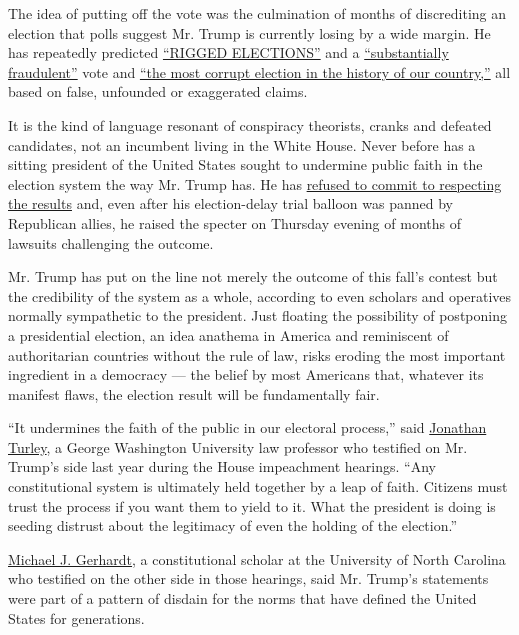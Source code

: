The idea of putting off the vote was the culmination of months of
discrediting an election that polls suggest Mr. Trump is currently
losing by a wide margin. He has repeatedly predicted
\href{https://twitter.com/realDonaldTrump/status/1256366878873792512}{``RIGGED
ELECTIONS''} and a
\href{https://twitter.com/realDonaldTrump/status/1265255835124539392?s=20}{``substantially
fraudulent''} vote and
\href{https://www.nytimes3xbfgragh.onion/2020/06/23/us/politics/trump-arizona.html}{``the
most corrupt election in the history of our country,''} all based on
false, unfounded or exaggerated claims.

It is the kind of language resonant of conspiracy theorists, cranks and
defeated candidates, not an incumbent living in the White House. Never
before has a sitting president of the United States sought to undermine
public faith in the election system the way Mr. Trump has. He has
\href{https://www.nytimes3xbfgragh.onion/aponline/2020/07/19/us/politics/ap-us-trump.html}{refused
to commit to respecting the results} and, even after his election-delay
trial balloon was panned by Republican allies, he raised the specter on
Thursday evening of months of lawsuits challenging the outcome.

Mr. Trump has put on the line not merely the outcome of this fall's
contest but the credibility of the system as a whole, according to even
scholars and operatives normally sympathetic to the president. Just
floating the possibility of postponing a presidential election, an idea
anathema in America and reminiscent of authoritarian countries without
the rule of law, risks eroding the most important ingredient in a
democracy --- the belief by most Americans that, whatever its manifest
flaws, the election result will be fundamentally fair.

``It undermines the faith of the public in our electoral process,'' said
\href{https://www.nytimes3xbfgragh.onion/2019/12/04/us/politics/jonathan-turley.html}{Jonathan
Turley}, a George Washington University law professor who testified on
Mr. Trump's side last year during the House impeachment hearings. ``Any
constitutional system is ultimately held together by a leap of faith.
Citizens must trust the process if you want them to yield to it. What
the president is doing is seeding distrust about the legitimacy of even
the holding of the election.''

\href{https://www.nytimes3xbfgragh.onion/2019/12/04/us/politics/michael-gerhardt.html}{Michael
J. Gerhardt}, a constitutional scholar at the University of North
Carolina who testified on the other side in those hearings, said Mr.
Trump's statements were part of a pattern of disdain for the norms that
have defined the United States for generations.

